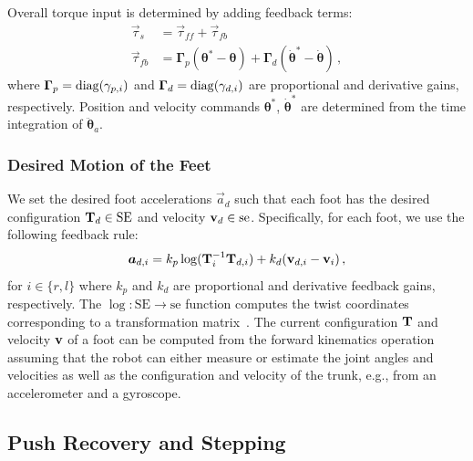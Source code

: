 \documentclass{llncs}
\newcommand{\mGamma} {\boldsymbol{\Gamma}}
\newcommand {\mat}[1] {{\bf #1}}
\newcommand{\mT} {\mat{T}}
\newcommand \se     {\mathrm{se}}
\newcommand \SE     {\mathrm{SE}}
\newcommand{\vddth} {\boldsymbol{\ddot{\theta}}}
\newcommand{\sv} {{\bf v}} %
\newcommand{\vth} {\boldsymbol{\theta}}
\newcommand{\vdth} {\boldsymbol{\dot{\theta}}}
\newcommand{\vtau}{\vec{\tau}}
\newcommand{\va}{\vec{a}}
\newcommand{\diag}{{\rm diag}}
\begin{document}

Overall torque input is determined by adding feedback terms:
\begin{align}
	\vtau_s &= \vtau_{ff} + \vtau_{fb} \label{eq:tau_s}\\
	\vtau_{fb} &= \mGamma_p ( \vth^\ast - \vth ) + \mGamma_d ( \vdth^\ast - \vdth ) \, ,
\end{align}
where $\mGamma_p=\diag(\gamma_{p,i})$ and $\mGamma_d=\diag(\gamma_{d,i})$ are proportional and derivative gains, respectively.
Position and velocity commands $\vth^\ast$, $\vdth^\ast$ are determined from
the time integration of $\vddth_a$.


\subsubsection{Desired Motion of the Feet}
\label{sec:desired_feet}
We set the desired foot accelerations $\va_d$ such that each
foot has the desired configuration $\mT_d\in\SE$ and velocity $\sv_d\in\se$.
Specifically, for each foot, we use the following feedback rule:
\begin{equation}
	\va_{d,i} = k_p\log(\mT_i^{-1}\mT_{d,i}) + k_d ( \sv_{d,i} - \sv_i ) \, ,
\end{equation}
for $i\in\{r,l\}$ where $k_p$ and $k_d$ are proportional and
derivative feedback gains, respectively. The
$\log:\SE \rightarrow \se$ function computes the twist coordinates
corresponding to a transformation matrix~\cite{MLS94}.
The current configuration  $\mT$ and velocity $\sv$ of a foot
can be computed from the forward kinematics operation
assuming that the robot can either measure or estimate
the joint angles and velocities as well as
the configuration and velocity of the trunk, e.g., from an accelerometer
and a gyroscope.


\subsection{Push Recovery and Stepping}
\end{document}
